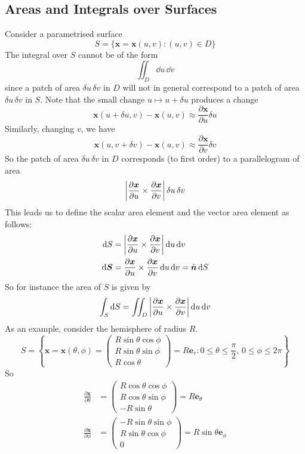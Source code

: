 \documentclass{article}
\begin{document}
\subsection{Areas and Integrals over Surfaces}
Consider a parametrised surface
\[ S = \{ \bm x = \bm x(u, v) \colon (u, v) \in D \} \]
The integral over $S$ cannot be of the form
\[ \iint_D \dd u\,\dd v \]
since a patch of area $\delta u \,\delta v$ in $D$ will not in general correspond to a patch of area $\delta u \,\delta v$ in $S$. Note that the small change $u \mapsto u + \delta u$ produces a change
\[ \bm x(u + \delta u, v) - \bm x(u, v) \approx \frac{\partial \bm x}{\partial u} \delta u \]
Similarly, changing $v$, we have
\[ \bm x(u, v + \delta v) - \bm x(u, v) \approx \frac{\partial \bm x}{\partial v} \delta v \]
So the patch of area $\delta u\,\delta v$ in $D$ corresponds (to first order) to a parallelogram of area
\[ \abs{\frac{\partial \bm x}{\partial u} \times \frac{\partial \bm x}{\partial v}} \,\delta u\,\delta v \]
This leads us to define the scalar area element and the vector area element as follows:
\begin{align*}
    \dd S     & = \abs{\frac{\partial \bm x}{\partial u} \times \frac{\partial \bm x}{\partial v}}\,\dd u\,\dd v           \\
    \dd \bm S & = \frac{\partial \bm x}{\partial u} \times \frac{\partial \bm x}{\partial v}\,\dd u\,\dd v = \hat{\bm n} \,\dd S
\end{align*}
So for instance the area of $S$ is given by
\[ \int_S \dd S = \iint_D \abs{\frac{\partial \bm x}{\partial u} \times \frac{\partial \bm x}{\partial v}}\,\dd u\,\dd v \]
As an example, consider the hemisphere of radius $R$.
\[ S = \left\{ \bm x = \bm x(\theta, \phi) = \begin{pmatrix}
        R\sin\theta \cos\phi \\ R\sin\theta \sin\phi \\ R\cos\theta
    \end{pmatrix} = R \bm e_r \colon 0 \leq \theta \leq \frac{\pi}{2},\, 0 \leq \phi \leq 2\pi \right\} \]
So
\begin{align*}
    \frac{\partial \bm x}{\partial \theta} & = \begin{pmatrix}
        R\cos\theta \cos\phi \\ R\cos\theta \sin\phi \\ -R\sin\theta
    \end{pmatrix} = R\bm e_\theta         \\
    \frac{\partial \bm x}{\partial \phi}   & = \begin{pmatrix}
        -R\sin\theta \sin\phi \\ R\sin\theta \cos\phi \\ 0
    \end{pmatrix} = R\sin\theta\bm e_\phi \\
\end{align*}
\end{document}
